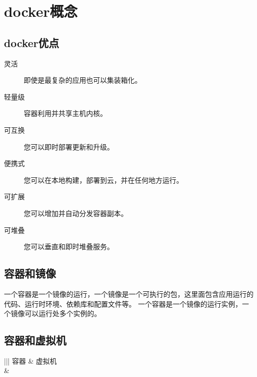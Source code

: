 \documentclass[letterpaper,10pt,english]{sphinxmanual}
\begin{document}
\chapter{docker概念}
\label{\detokenize{_u5feb_u901f_u5165_u95e8/01-docker_u6982_u5ff5::doc}}\label{\detokenize{_u5feb_u901f_u5165_u95e8/01-docker_u6982_u5ff5:docker}}

\section{docker优点}
\label{\detokenize{_u5feb_u901f_u5165_u95e8/01-docker_u6982_u5ff5:id1}}\begin{description}
\item[{灵活}] \leavevmode
即使是最复杂的应用也可以集装箱化。

\item[{轻量级}] \leavevmode
容器利用并共享主机内核。

\item[{可互换}] \leavevmode
您可以即时部署更新和升级。

\item[{便携式}] \leavevmode
您可以在本地构建，部署到云，并在任何地方运行。

\item[{可扩展}] \leavevmode
您可以增加并自动分发容器副本。

\item[{可堆叠}] \leavevmode
您可以垂直和即时堆叠服务。

\end{description}


\section{容器和镜像}
\label{\detokenize{_u5feb_u901f_u5165_u95e8/01-docker_u6982_u5ff5:id2}}
一个容器是一个镜像的运行，一个镜像是一个可执行的包，这里面包含应用运行的代码、运行时环境、依赖库和配置文件等。
一个容器是一个镜像的运行实例，一个镜像可以运行处多个实例的。


\section{容器和虚拟机}
\label{\detokenize{_u5feb_u901f_u5165_u95e8/01-docker_u6982_u5ff5:id3}}

\begin{savenotes}\sphinxattablestart
\centering
\begin{tabular}[t]{|||}
\hline
\sphinxstyletheadfamily 
容器
&\sphinxstyletheadfamily 
虚拟机
\\
\hline
\noindent{}
&
\noindent{}
\\
\hline
\end{tabular}
\par
\sphinxattableend\end{savenotes}
\end{document}
